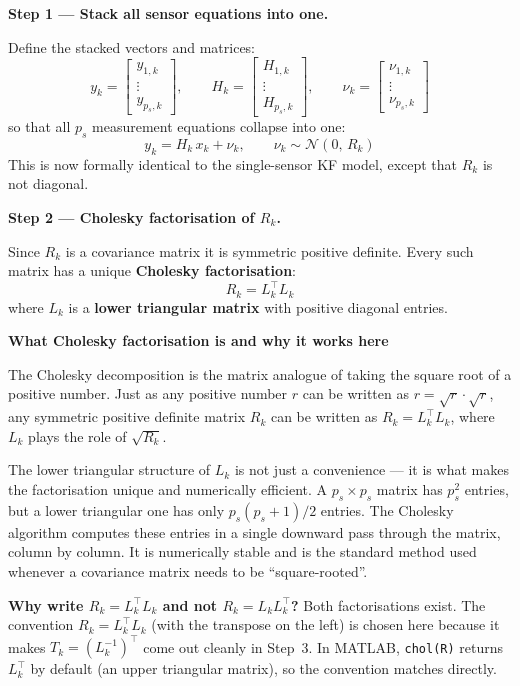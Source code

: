 \documentclass[12pt, a4paper]{article}
\begin{document}
\textbf{Step 1 --- Stack all sensor equations into one.}

Define the stacked vectors and matrices:
\[
  y_k = \begin{bmatrix} y_{1,k} \\ \vdots \\ y_{p_s,k} \end{bmatrix},
  \qquad
  H_k = \begin{bmatrix} H_{1,k} \\ \vdots \\ H_{p_s,k} \end{bmatrix},
  \qquad
  \nu_k = \begin{bmatrix} \nu_{1,k} \\ \vdots \\ \nu_{p_s,k} \end{bmatrix}
\]
so that all $p_s$ measurement equations collapse into one:
\[
  y_k = H_k\, x_k + \nu_k, \qquad \nu_k \sim \mathcal{N}(0,\, R_k)
\]
This is now formally identical to the single-sensor KF model, except that
$R_k$ is not diagonal.

\textbf{Step 2 --- Cholesky factorisation of $R_k$.}

Since $R_k$ is a covariance matrix it is symmetric positive definite.
Every such matrix has a unique \textbf{Cholesky factorisation}:
\[
  R_k = L_k^\top L_k
\]
where $L_k$ is a \textbf{lower triangular matrix} with positive diagonal
entries.

\begin{notebox}
  \textbf{What Cholesky factorisation is and why it works here}

  The Cholesky decomposition is the matrix analogue of taking the square root
  of a positive number.
  Just as any positive number $r$ can be written as $r = \sqrt{r} \cdot
  \sqrt{r}$, any symmetric positive definite matrix $R_k$ can be written as
  $R_k = L_k^\top L_k$, where $L_k$ plays the role of $\sqrt{R_k}$.

  The lower triangular structure of $L_k$ is not just a convenience ---
  it is what makes the factorisation unique and numerically efficient.
  A $p_s \times p_s$ matrix has $p_s^2$ entries, but a lower triangular one
  has only $p_s(p_s+1)/2$ entries.
  The Cholesky algorithm computes these entries in a single downward pass
  through the matrix, column by column.
  It is numerically stable and is the standard method used whenever a
  covariance matrix needs to be ``square-rooted''.

  \textbf{Why write $R_k = L_k^\top L_k$ and not $R_k = L_k L_k^\top$?}
  Both factorisations exist.
  The convention $R_k = L_k^\top L_k$ (with the transpose on the left)
  is chosen here because it makes $T_k = (L_k^{-1})^\top$ come out cleanly
  in Step~3.
  In MATLAB, \texttt{chol(R)} returns $L_k^\top$ by default (an upper
  triangular matrix), so the convention matches directly.
\end{notebox}
\end{document}
